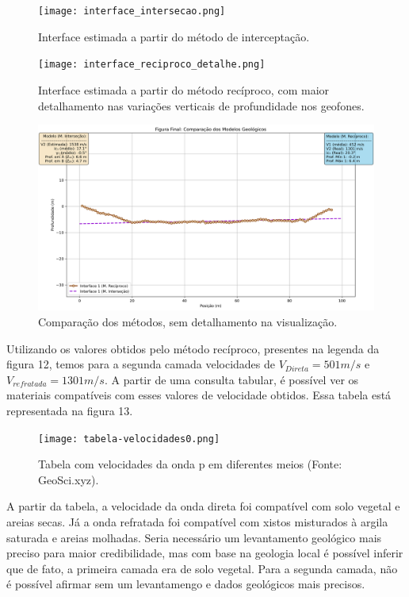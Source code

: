 \documentclass[a4paper,12pt]{article}
\begin{document}
\begin{figure}[H]
    \centering
    \texttt{[image: interface\_intersecao.png]}
    \caption{Interface estimada a partir do método de interceptação.}
    \label{fig:placeholder}
\end{figure}

\begin{figure}[H]
    \centering
    \texttt{[image: interface\_reciproco\_detalhe.png]}
    \caption{Interface estimada a partir do método recíproco, com maior detalhamento nas variações verticais de profundidade nos geofones.}
    \label{fig:placeholder}
\end{figure}


\begin{figure}[H]
    \centering
    \includegraphics[width=0.5\linewidth]{interfaces_finais_comparativo.png}
    \caption{Comparação dos métodos, sem detalhamento na visualização.}
    \label{fig:placeholder}
\end{figure}


Utilizando os valores obtidos pelo método recíproco, presentes na legenda da figura 12, temos para a segunda camada velocidades de $V_{Direta} = 501m/s$ e $V_{refratada} = 1301 m/s$. A partir de uma consulta tabular, é possível ver os materiais compatíveis com esses valores de velocidade obtidos. Essa tabela está representada na figura 13.

\begin{figure}[H]
    \centering
    \texttt{[image: tabela-velocidades0.png]}
    \caption{Tabela com velocidades da onda p em diferentes meios (Fonte: GeoSci.xyz).}
    \label{fig:placeholder}
\end{figure}

A partir da tabela, a velocidade da onda direta foi compatível com solo vegetal e areias secas. Já a onda refratada foi compatível com xistos misturados à argila saturada e areias molhadas. Seria necessário um levantamento geológico mais preciso para maior credibilidade, mas com base na geologia local é possível inferir que de fato, a primeira camada era de solo vegetal. Para a segunda camada, não é possível afirmar sem um levantamengo e dados geológicos mais precisos. 
\end{document}
